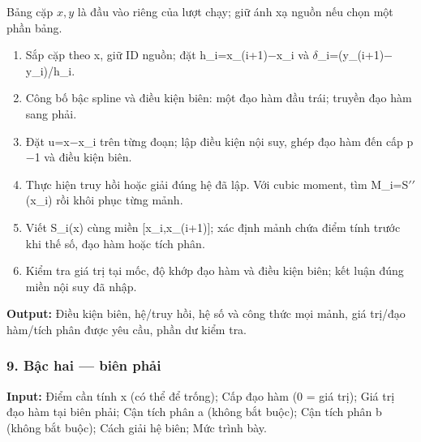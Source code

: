Bảng cặp $x,y$ là đầu vào riêng của lượt chạy; giữ ánh xạ nguồn nếu chọn một phần bảng.

\begin{enumerate}

\item Sắp cặp theo x,\allowbreak{} giữ ID nguồn;\allowbreak{} đặt h\_i=\allowbreak{}x\_(\allowbreak{}i+\allowbreak{}1)\ensuremath{-}x\_i và \ensuremath{\delta}\_i=\allowbreak{}(\allowbreak{}y\_(\allowbreak{}i+\allowbreak{}1)\ensuremath{-}y\_i)/\allowbreak{}h\_i.

\item Công bố bậc spline và điều kiện biên: một đạo hàm đầu trái;\allowbreak{} truyền đạo hàm sang phải.

\item Đặt u=\allowbreak{}x\ensuremath{-}x\_i trên từng đoạn;\allowbreak{} lập điều kiện nội suy,\allowbreak{} ghép đạo hàm đến cấp p\ensuremath{-}1 và điều kiện biên.

\item Thực hiện truy hồi hoặc giải đúng hệ đã lập. Với cubic moment,\allowbreak{} tìm M\_i=\allowbreak{}S\ensuremath{\prime\prime}(\allowbreak{}x\_i) rồi khôi phục từng mảnh.

\item Viết S\_i(\allowbreak{}x) cùng miền [x\_i,\allowbreak{}x\_(\allowbreak{}i+\allowbreak{}1)];\allowbreak{} xác định mảnh chứa điểm tính trước khi thế số,\allowbreak{} đạo hàm hoặc tích phân.

\item Kiểm tra giá trị tại mốc,\allowbreak{} độ khớp đạo hàm và điều kiện biên;\allowbreak{} kết luận đúng miền nội suy đã nhập.

\end{enumerate}

\textbf{Output:} Điều kiện biên,\allowbreak{} hệ/\allowbreak{}truy hồi,\allowbreak{} hệ số và công thức mọi mảnh,\allowbreak{} giá trị/\allowbreak{}đạo hàm/\allowbreak{}tích phân được yêu cầu,\allowbreak{} phần dư kiểm tra.

\examplebreak\subsubsection*{9. Bậc hai — biên phải}

\textbf{Input:} Điểm cần tính x (\allowbreak{}có thể để trống);\allowbreak{} Cấp đạo hàm (\allowbreak{}0 =\allowbreak{} giá trị);\allowbreak{} Giá trị đạo hàm tại biên phải;\allowbreak{} Cận tích phân a (\allowbreak{}không bắt buộc);\allowbreak{} Cận tích phân b (\allowbreak{}không bắt buộc);\allowbreak{} Cách giải hệ biên;\allowbreak{} Mức trình bày.

